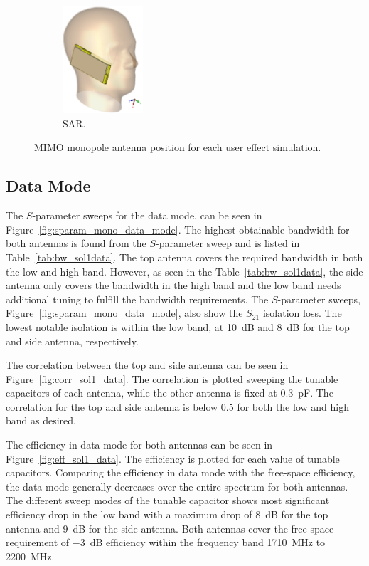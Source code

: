 \begin{figure}[htbp]
\begin{subfigure}[b]{0.24\linewidth}
    \end{subfigure}
    \begin{subfigure}[b]{0.24\linewidth}
        \centering \includegraphics[width=\linewidth,height=4cm,keepaspectratio]{img/tech_sol/monopole/sar/3d_sar.PNG}
        \caption{SAR.}
    \end{subfigure}
    \caption{MIMO monopole antenna position for each user effect simulation.}
    \label{fig:sol1_monoant_positions}
\end{figure}

\FloatBarrier
\subsection{Data Mode}

The $S$-parameter sweeps for the data mode, can be seen in Figure~\ref{fig:sparam_mono_data_mode}. The highest obtainable bandwidth for both antennas is found from the $S$-parameter sweep and is listed in Table~\ref{tab:bw_sol1data}. The top antenna covers the required bandwidth in both the low and high band. However, as seen in the Table~\ref{tab:bw_sol1data}, the side antenna only covers the bandwidth in the high band and the low band needs additional tuning to fulfill the bandwidth requirements. The $S$-parameter sweeps, Figure~\ref{fig:sparam_mono_data_mode}, also show the $S_{21}$ isolation loss. The lowest notable isolation is within the low band, at \SI{10}{dB} and \SI{8}{dB} for the top and side antenna, respectively.       

The correlation between the top and side antenna can be seen in Figure~\ref{fig:corr_sol1_data}. The correlation is plotted sweeping the tunable capacitors of each antenna, while the other antenna is fixed at \SI{0.3}{pF}. The correlation for the top and side antenna is below \num{0.5} for both the low and high band as desired.

The efficiency in data mode for both antennas can be seen in Figure~\ref{fig:eff_sol1_data}. The efficiency is plotted for each value of tunable capacitors. Comparing the efficiency in data mode with the free-space efficiency, the data mode generally decreases over the entire spectrum for both antennas. The different sweep modes of the tunable capacitor shows most significant efficiency drop in the low band with a maximum drop of \SI{8}{dB} for the top antenna and \SI{9}{dB} for the side antenna. Both antennas cover the free-space requirement of \SI{-3}{dB} efficiency within the frequency band \SI{1710}{MHz} to \SI{2200}{MHz}.

